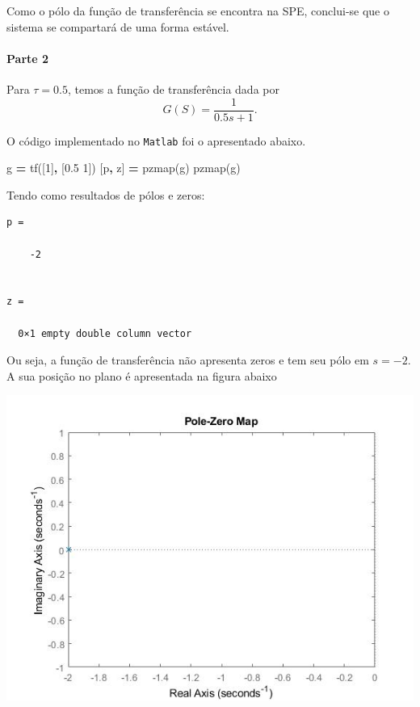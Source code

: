 \documentclass[
]{book}
\newenvironment{Shaded}{\begin{snugshade}}{\end{snugshade}}
\newcommand{\FloatTok}[1]{\textcolor[rgb]{0.00,0.00,0.81}{#1}}
\newcommand{\NormalTok}[1]{#1}
\newcommand{\OperatorTok}[1]{\textcolor[rgb]{0.81,0.36,0.00}{\textbf{#1}}}
\newcommand{\VariableTok}[1]{\textcolor[rgb]{0.00,0.00,0.00}{#1}}
\theoremstyle{definition}
\theoremstyle{definition}
\theoremstyle{definition}
\theoremstyle{remark}
\begin{document}
Como o pólo da função de transferência se encontra na SPE, conclui-se que o sistema se compartará de uma forma estável.

\hypertarget{parte-2}{%
\paragraph*{Parte 2}\label{parte-2}}

Para \(\tau = 0.5\), temos a função de transferência dada por
\[
G(S)= \frac {1}{0.5s+1}.
\]

O código implementado no \texttt{Matlab} foi o apresentado abaixo.

\begin{Shaded}
\begin{Highlighting}[]
\VariableTok{g} \OperatorTok{=} \VariableTok{tf}\NormalTok{([}\FloatTok{1}\NormalTok{]}\OperatorTok{,}\NormalTok{ [}\FloatTok{0.5} \FloatTok{1}\NormalTok{])}
\NormalTok{[}\VariableTok{p}\OperatorTok{,} \VariableTok{z}\NormalTok{] }\OperatorTok{=} \VariableTok{pzmap}\NormalTok{(}\VariableTok{g}\NormalTok{)}
\VariableTok{pzmap}\NormalTok{(}\VariableTok{g}\NormalTok{)}
\end{Highlighting}
\end{Shaded}

Tendo como resultados de pólos e zeros:

\begin{verbatim}
p =

    -2


z =

  0×1 empty double column vector
\end{verbatim}

Ou seja, a função de transferência não apresenta zeros e tem seu pólo em \(s = -2\). A sua posição no plano é apresentada na figura abaixo

\includegraphics{Imagens/Lab2/tau2.jpg}
\end{document}
